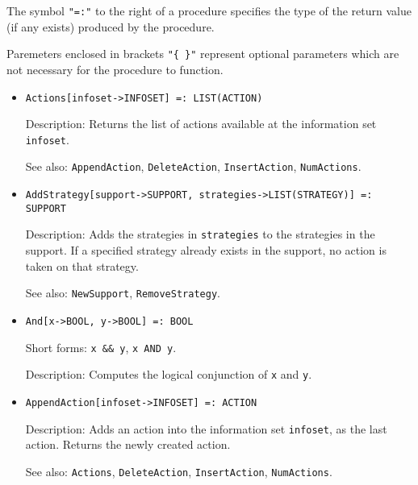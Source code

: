 The symbol {\tt "=:"} to the right of a procedure specifies the type
of the return value (if any exists) produced by the procedure.

Paremeters enclosed in brackets {\tt "\{ \}"} represent optional
parameters which are not necessary for the procedure to function.

\begin{itemize}


\item
\protect \large \begin{verbatim} 
Actions[infoset->INFOSET] =: LIST(ACTION)
\end{verbatim}\normalsize

\bd
\item
[Description:] Returns the list of actions available at the information set
\verb+infoset+.
\item
[See also:] {\tt AppendAction}, {\tt DeleteAction}, {\tt InsertAction},
{\tt NumActions}.
\ed

\item
\protect \large \begin{verbatim}
AddStrategy[support->SUPPORT, strategies->LIST(STRATEGY)] =: SUPPORT
\end{verbatim}\normalsize

\bd
\item
[Description:] Adds the strategies in \verb+strategies+ to the
strategies in the support.  If a specified strategy already exists in
the support, no action is taken on that strategy.
\item
[See also:] {\tt NewSupport}, {\tt RemoveStrategy}.
\ed

\item 
\protect \large \begin{verbatim}
And[x->BOOL, y->BOOL] =: BOOL
\end{verbatim} \normalsize
\bd
\item
[Short forms:] \verb+x && y+, \verb+x AND y+.
\item
[Description:] Computes the logical conjunction of \verb+x+ and \verb+y+.
\ed


\item
\protect \large \begin{verbatim}
AppendAction[infoset->INFOSET] =: ACTION
\end{verbatim}\normalsize

\bd
\item
[Description:] Adds an action into the information set \verb+infoset+,
as the last action.  Returns the newly created action.
\item
[See also:] {\tt Actions}, {\tt DeleteAction}, {\tt InsertAction},
{\tt NumActions}.
\ed



\end{itemize}
